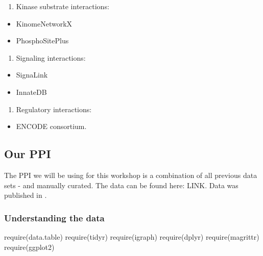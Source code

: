 \documentclass[
]{book}
\newenvironment{Shaded}{\begin{snugshade}}{\end{snugshade}}
\newcommand{\FunctionTok}[1]{\textcolor[rgb]{0.00,0.00,0.00}{#1}}
\newcommand{\NormalTok}[1]{#1}
\providecommand{\tightlist}{%
  \setlength{\itemsep}{0pt}\setlength{\parskip}{0pt}}
\begin{document}
\begin{enumerate}
\def\labelenumi{\arabic{enumi}.}
\setcounter{enumi}{4}
\tightlist
\item
  Kinase substrate interactions:
\end{enumerate}

\begin{itemize}
\tightlist
\item
  KinomeNetworkX \citep{cheng2014}
\item
  PhosphoSitePlus \citep{Hornbeck2015}
\end{itemize}

\begin{enumerate}
\def\labelenumi{\arabic{enumi}.}
\setcounter{enumi}{5}
\tightlist
\item
  Signaling interactions:
\end{enumerate}

\begin{itemize}
\tightlist
\item
  SignaLink \citep{Fazekas2013}
\item
  InnateDB \citep{Breuer2013}
\end{itemize}

\begin{enumerate}
\def\labelenumi{\arabic{enumi}.}
\setcounter{enumi}{6}
\tightlist
\item
  Regulatory interactions:
\end{enumerate}

\begin{itemize}
\tightlist
\item
  ENCODE consortium.
\end{itemize}

\hypertarget{our-ppi}{%
\subsection{Our PPI}\label{our-ppi}}

The PPI we will be using for this workshop is a combination of all previous data sets - and manually curated. The data can be found here: LINK. Data was published in \citet{Gysi2020a}.

\hypertarget{understanding-the-data}{%
\subsubsection{Understanding the data}\label{understanding-the-data}}

\begin{Shaded}
\begin{Highlighting}[]
\FunctionTok{require}\NormalTok{(data.table)}
\FunctionTok{require}\NormalTok{(tidyr)}
\FunctionTok{require}\NormalTok{(igraph)}
\FunctionTok{require}\NormalTok{(dplyr)}
\FunctionTok{require}\NormalTok{(magrittr)}
\FunctionTok{require}\NormalTok{(ggplot2)}
\end{Highlighting}
\end{Shaded}
\end{document}
